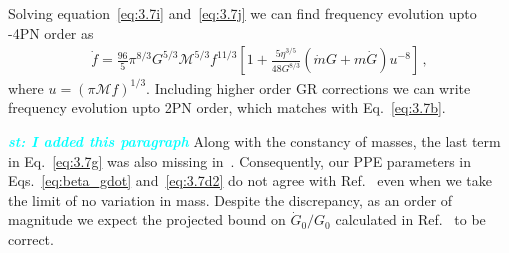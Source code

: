 \documentclass[prd,twocolumn,nofootinbib]{revtex4-1}
\newcommand{\st}[1]{\textcolor{cyan}{\it{\textbf{st: #1}}} }
\begin{document}
Solving equation~\eqref{eq:3.7i} and~\eqref{eq:3.7j} we can find frequency evolution upto -4PN order as
 \begin{align} 
 \dot{f}=\frac{96}{5}\pi^{8/3}G^{5/3}\mathcal{M}^{5/3}f^{11/3}[1+\frac{5\eta^{3/5}}{48 G^{8/3}}(\dot{m}G+m\dot{G})u^{-8}]\,,
 \end{align} 
where $u=(\pi \mathcal{M}f)^{1/3}$. Including higher order GR corrections we can write frequency evolution upto 2PN order, which matches with Eq.~\eqref{eq:3.7b}.

\st{I added this paragraph}
Along with the constancy of masses, the last term in Eq.~\eqref{eq:3.7g} was also missing in~\cite{Yunes:2009bv}. Consequently, our PPE parameters in Eqs.~\eqref{eq:beta_gdot} and~\eqref{eq:3.7d2} do not agree with Ref.~\cite{Yunes:2009bv} even when we take the limit of no variation in mass. Despite the discrepancy, as an order of magnitude we expect the projected bound on $\dot{G}_0/G_0$ calculated in Ref.~\cite{Yunes:2009bv} to be correct.

%
%

\end{document}
